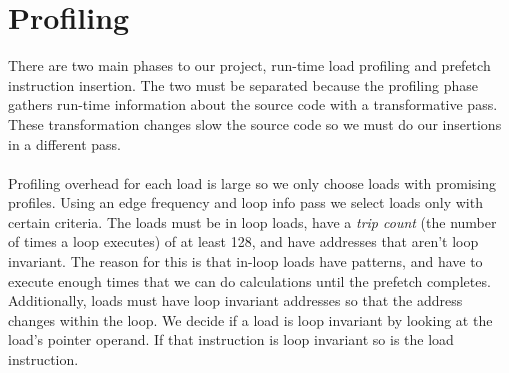 \documentclass[11pt]{article}
\begin{document}
  \section{Profiling}
  There are two main phases to our project, run-time load profiling and prefetch instruction insertion. The two must be separated because the profiling phase gathers run-time information about the source code with a transformative pass. These transformation changes slow the source code so we must do our insertions in a different pass.
  \\\\Profiling overhead for each load is large so we only choose loads with promising profiles. Using an edge frequency and loop info pass we select loads only with certain criteria. The loads must be in loop loads, have a \textit{trip count} (the number of times a loop executes) of at least 128, and have addresses that aren’t loop invariant. The reason for this is that in-loop loads have patterns, and have to execute enough times that we can do calculations until the prefetch completes. Additionally, loads must have loop invariant addresses so that the address changes within the loop. We decide if a load is loop invariant by looking at the load’s pointer operand. If that instruction is loop invariant so is the load instruction.
  \\
\end{document}
